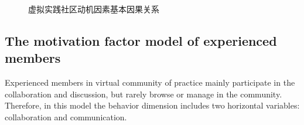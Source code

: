 \documentclass{elsarticle}
\begin{document}
\begin{figure}[htpb]
  \centering
  \label{fig:cause-and-effect}
  \caption{虚拟实践社区动机因素基本因果关系}
\end{figure}

\subsection{The motivation factor model of experienced members}
\label{sec:motiv-fact-model}

 Experienced members in virtual community of practice mainly
 participate in the collaboration and discussion, but rarely browse or
 manage in the community. Therefore, in this model the behavior
 dimension includes two horizontal variables: collaboration and
 communication. 
\end{document}
